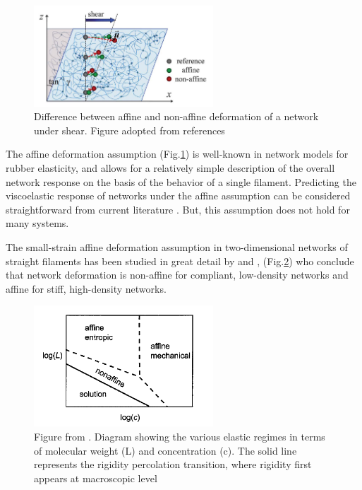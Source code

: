  \begin{figure}[ht]
\begin{center}
\includegraphics[width=0.6\textwidth]{Figures/chapter-intro/nonaffine.png}%

\caption[Affine and non-affine deformations]{ Difference between affine
and non-affine deformation of a network under shear. Figure adopted from
references \citep{wen_non-affine_2012,basu_nonaffine_2011}
}
\label{fig:nonaffine}
\end{center}
\end{figure}
The affine deformation assumption (Fig.\ref{fig:nonaffine}) is well-known in
network models for rubber elasticity, and allows for a relatively
simple description of the overall network response on the basis of the behavior
of a single filament. Predicting the viscoelastic response of networks under the affine assumption can be considered straightforward from current literature \cite{rizzi_importance_2016}.
But, this assumption does not hold for many systems.

The small-strain affine deformation assumption in two-dimensional
networks of straight filaments has
been studied in great detail by \citet{head_distinct_2003,head_mechanical_2005}
and \citet{wilhelm_elasticity_2003}, (Fig.\ref{fig:nonaffine-head}) who conclude
that network deformation is non-affine for compliant, low-density networks
and affine for stiff, high-density networks.
 \begin{figure}[ht]
\begin{center}
\includegraphics[width=0.6\textwidth]{Figures/chapter-intro/nonaffine-head.png}%

\caption[Affine and non-affine phases]{ Figure from
\citet{head_mechanical_2005}. Diagram showing the various elastic regimes in
terms of molecular weight (L) and concentration (c). The solid line represents
the rigidity percolation transition, where rigidity first appears at
macroscopic level}
\label{fig:nonaffine-head}
\end{center}
\end{figure}

